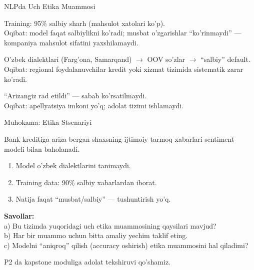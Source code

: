 \documentclass[aspectratio=169,11pt]{beamer}
\begin{document}
\begin{frame}{NLPda Uch Etika Muammosi}
  \begin{tcolorbox}[warnbox,title=1.\ Qiyshiq ma'lumot (Skewed Data)]
    \small
    Training: 95\% salbiy sharh (mahsulot xatolari ko'p).\\
    Oqibat: model faqat salbiylikni ko'radi;
    musbat o'zgarishlar ``ko'rinmaydi'' ---
    kompaniya mahsulot sifatini yaxshilamaydi.
  \end{tcolorbox}
  \vspace{3pt}
  \begin{tcolorbox}[warnbox,title=2.\ Kam resursli til (Low-Resource)]
    \small
    O'zbek dialektlari (Farg'ona, Samarqand) $\to$ OOV so'zlar
    $\to$ ``salbiy'' default.\\
    Oqibat: regional foydalanuvchilar
    kredit yoki xizmat tizimida sistematik zarar ko'radi.
  \end{tcolorbox}
  \vspace{3pt}
  \begin{tcolorbox}[warnbox,title=3.\ Shaffoflik yo'qligi (Opacity)]
    \small
    ``Arizangiz rad etildi'' --- sabab ko'rsatilmaydi.\\
    Oqibat: apellyatsiya imkoni yo'q;
    adolat tizimi ishlamaydi.
  \end{tcolorbox}
\end{frame}

\begin{frame}{Muhokama: Etika Stsenariyi}
  \begin{tcolorbox}[warnbox,title=Stsenariy (5 daqiqa)]
    \small
    Bank kreditiga ariza bergan shaxsning ijtimoiy tarmoq
    xabarlari sentiment modeli bilan baholanadi.\\[5pt]
    \begin{enumerate}
      \item Model o'zbek dialektlarini tanimaydi.
      \item Training data: 90\% salbiy xabarlardan iborat.
      \item Natija faqat ``musbat/salbiy'' --- tushuntirish yo'q.
    \end{enumerate}
    \vspace{5pt}
    \textbf{Savollar:}\\[3pt]
    a)\; Bu tizimda yuqoridagi uch etika muammosining qaysilari mavjud?\\[3pt]
    b)\; Har bir muammo uchun bitta amaliy yechim taklif eting.\\[3pt]
    c)\; Modelni ``aniqroq'' qilish (accuracy oshirish) etika
         muammosini hal qiladimi?
  \end{tcolorbox}
  \vspace{3pt}
  \small\textcolor{halfgray}{P2 da kapstone moduliga adolat tekshiruvi qo'shamiz.}
\end{frame}
\end{document}
